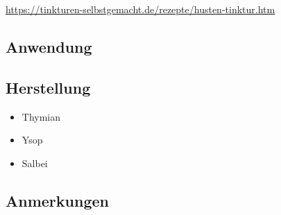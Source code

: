 \cite{tinkturen}  

\url{https://tinkturen-selbstgemacht.de/rezepte/husten-tinktur.htm} 


\subsection{Anwendung}

\subsection{Herstellung}

\begin{itemize}
	\item Thymian
	\item Ysop
	\item Salbei
\end{itemize}

\subsection{Anmerkungen}











